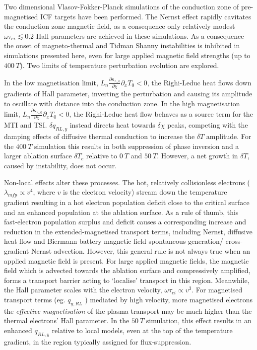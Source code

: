 \documentclass[aip,reprint]{revtex4-1}
\begin{document}
Two dimensional Vlasov-Fokker-Planck simulations of the conduction zone of pre-magnetised ICF targets have been performed. The Nernst effect rapidly cavitates the conduction zone magnetic field, as a consequence only relatively modest $\omega \tau_{ei} \lesssim 0.2$ Hall parameters are achieved in these simulations.  As a consequence the onset of magneto-thermal and Tidman Shanny instabilities is inhibited in simulations presented here, even for large applied magnetic field strengths (up to $\SI{400}{T}$). Two limits of temperature perturbation evolution are explored. 

In the low magnetisation limit, $L_n \frac{\partial \kappa_{\wedge,0}}{\partial \chi} \partial_x T_0 < 0$, the Righi-Leduc heat flows down gradients of Hall parameter, inverting the perturbation and causing its amplitude to oscillate with distance into the conduction zone. In the high magnetisation limit, $L_n \frac{\partial \kappa_{\wedge,0}}{\partial \chi} \partial_x T_0 < 0$, the Righi-Leduc heat flow behaves as a source term for the MTI and TSI. $\delta q_{RL,y}$ instead directs heat towards $\delta \chi$ peaks, competing with the damping effects of diffusive thermal conduction to increase the $\delta T$ amplitude. For the $\SI{400}{T}$ simulation this results in both suppression of phase inversion and a larger ablation surface $\delta T_e$ relative to $\SI{0}{T}$ and $\SI{50}{T}$. However,  a net growth in $\delta T$,  caused by instability, does not occur.


Non-local effects alter these processes. The hot, relatively collisionless electrons ($\lambda_{mfp} \propto v^4$, where $v$ is the electron velocity) stream down the temperature gradient resulting in a hot electron population deficit close to the critical surface and an enhanced population at the ablation surface.  As a rule of thumb, this fast-electron population surplus and deficit causes a corresponding increase and reduction in the extended-magnetised transport terms, including Nernst, diffusive heat flow and Biermann battery magnetic field spontaneous generation/ cross-gradient Nernst advection. However, this general rule is not always true when an applied magnetic field is present. For large applied magnetic fields, the magnetic field which is advected towards the ablation surface and compressively amplified, forms a transport barrier acting to `localise’ transport in this region. Meanwhile, the Hall parameter scales with the electron velocity, $\omega \tau_{ei} \propto v^{3}$. For magnetised transport terms (eg. $q_{y,RL}$ \cite{Kho1985}) mediated by high velocity, more magnetised electrons the \emph{effective magnetisation} of the plasma transport may be much higher than the thermal electrons' Hall parameter. In the $\SI{50}{T}$ simulation, this effect results in an enhanced $q_{RL,y}$ relative to local models, even at the top of the temperature gradient, in the region typically assigned for flux-suppression. 
\end{document}
